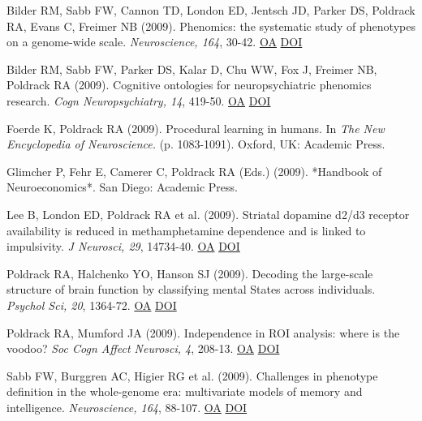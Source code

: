 \documentclass[10pt, letterpaper]{article}
\begin{document}
Bilder RM, Sabb FW, Cannon TD, London ED, Jentsch JD, Parker DS, Poldrack RA, Evans C, Freimer NB (2009). Phenomics: the systematic study of phenotypes on a genome-wide scale. \textit{Neuroscience, 164}, 30-42. \href{https://www.ncbi.nlm.nih.gov/pmc/articles/PMC2760679}{OA} \href{http://dx.doi.org/10.1016/j.neuroscience.2009.01.027}{DOI} \vspace{2mm}

Bilder RM, Sabb FW, Parker DS, Kalar D, Chu WW, Fox J, Freimer NB, Poldrack RA (2009). Cognitive ontologies for neuropsychiatric phenomics research. \textit{Cogn Neuropsychiatry, 14}, 419-50. \href{https://www.ncbi.nlm.nih.gov/pmc/articles/PMC2752634}{OA} \href{http://dx.doi.org/10.1080/13546800902787180}{DOI} \vspace{2mm}

Foerde K, Poldrack RA (2009). Procedural learning in humans. In \textit{The New Encyclopedia of Neuroscience.} (p. 1083-1091). Oxford, UK: Academic Press. \vspace{2mm}

Glimcher P, Fehr E, Camerer C, Poldrack RA (Eds.) (2009).  *Handbook of Neuroeconomics*. San Diego: Academic Press. \vspace{2mm}

Lee B, London ED, Poldrack RA et al. (2009). Striatal dopamine d2/d3 receptor availability is reduced in methamphetamine dependence and is linked to impulsivity. \textit{J Neurosci, 29}, 14734-40. \href{https://www.ncbi.nlm.nih.gov/pmc/articles/PMC2822639}{OA} \href{http://dx.doi.org/10.1523/jneurosci.3765-09.2009}{DOI} \vspace{2mm}

Poldrack RA, Halchenko YO, Hanson SJ (2009). Decoding the large-scale structure of brain function by classifying mental States across individuals. \textit{Psychol Sci, 20}, 1364-72. \href{https://www.ncbi.nlm.nih.gov/pmc/articles/PMC2935493}{OA} \href{http://dx.doi.org/10.1111/j.1467-9280.2009.02460.x}{DOI} \vspace{2mm}

Poldrack RA, Mumford JA (2009). Independence in ROI analysis: where is the voodoo? \textit{Soc Cogn Affect Neurosci, 4}, 208-13. \href{https://www.ncbi.nlm.nih.gov/pmc/articles/PMC2686233}{OA} \href{http://dx.doi.org/10.1093/scan/nsp011}{DOI} \vspace{2mm}

Sabb FW, Burggren AC, Higier RG et al. (2009). Challenges in phenotype definition in the whole-genome era: multivariate models of memory and intelligence. \textit{Neuroscience, 164}, 88-107. \href{https://www.ncbi.nlm.nih.gov/pmc/articles/PMC2766544}{OA} \href{http://dx.doi.org/10.1016/j.neuroscience.2009.05.013}{DOI} \vspace{2mm}
\end{document}
